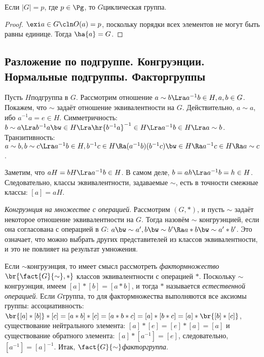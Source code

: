 \documentclass[a4paper]{article}
\begin{document}
\begin{imp}
Если $|G|=p$, где $p \in \Pg$, то $G$\т циклическая группа.
\end{imp}
\begin{proof}
$\exi a \in G\cln O(a)=p$, поскольку порядки всех элементов не могут быть равны единице. Тогда $\ha{a}=G$.
\end{proof}

\subsection{Разложение по подгруппе. Конгруэнции. Нормальные подгруппы. Факторгруппы}

Пусть $H$\т подгруппа в $G$. Рассмотрим отношение $a \sim b \Lra a^{-1}b \in H, a, b \in G$.  Покажем, что
$\sim$ задаёт отношение эквивалентности на $G$. Действительно, $a \sim a$, ибо $a^{-1}a = e \in H$.
Симметричность: $b \sim a \Lra b^{-1}a \bw\in H \Lra \hr{b^{-1}a}^{-1} \in H \Lra a^{-1}b \in H \Lra a \sim b$.
Транзитивность: $a \sim b, b \sim c \Lra a^{-1}b \in H, b^{-1}c \in H \Ra (a^{-1}b)(b^{-1}c) \bw\in H \Ra
a^{-1}c \in H \Ra a \sim c$.

Заметим, что $aH=bH \Lra a^{-1}b \in H$. В самом деле, $b=ah \Lra a^{-1}b=h\in H$.  Следовательно, классы
эквивалентности, задаваемые $\sim$, есть в точности смежные классы: $[a]=aH$.

\begin{df}
\emph{Конгруэнция на множестве с операцией}. Рассмотрим $(G, *)$, и пусть $\sim$  задаёт некоторое отношение
эквивалентности на $G$. Тогда назовём $\sim$ конгруэнцией, если она согласована с операцией в $G$:
$a \bw\sim a', b \bw\sim b' \Ra a*b \bw\sim a'* b'$. Это означает, что можно выбрать других представителей из классов
эквивалентности, и это не повлияет на результат умножения.
\end{df}

\begin{df}
Если $\sim$\т конгруэнция, то имеет смысл рассмотреть \emph{фактормножество} $\br{\fact{G}{\sim}, *}$ классов
эквивалентности с операцией $*$. Поскольку $\sim$\т конгруэнция, имеем  $[a]*[b]=[a*b]$, и тогда $*$
называется \emph{естественной операцией}. Если $G$\т группа, то для фактормножества выполняются все аксиомы
группы: ассоциативность: $\br{[a]*[b]}*[c]=[a*b]*[c]=[a*b*c]=[a]*[b*c]=[a]*\br{[b]*[c]}$, существование
нейтрального элемента: $[a]*[e]=[e]*[a]=[a]$ и существование обратного элемента: $[a]*[a^{-1}]=[e]$,
следовательно, $[a^{-1}]=[a]^{-1}$. Итак, $\fact{G}{\sim}$\т \emph{факторгруппа}.
\end{df}
\end{document}
